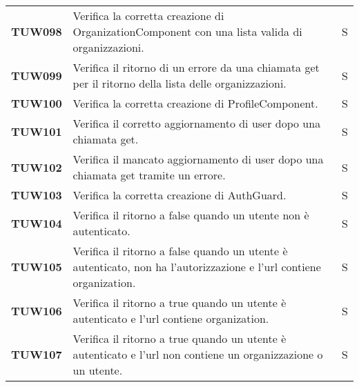 \documentclass[../../piano-di-qualifica.tex]{subfiles}
\begin{document}
\begin{longtable}[H]{>{\centering\bfseries}m{3cm} >{}m{10cm} >{\centering\arraybackslash}m{3cm}}
  TUW098             & Verifica la corretta creazione di OrganizationComponent con una lista valida di organizzazioni.                     & S                             \\

  TUW099             & Verifica il ritorno di un errore da una chiamata get per il ritorno della lista delle organizzazioni.               & S                             \\



  TUW100             & Verifica la corretta creazione di ProfileComponent.                                                                 & S                             \\

  TUW101             & Verifica il corretto aggiornamento di user dopo una chiamata get.                                                   & S                             \\

  TUW102             & Verifica il mancato aggiornamento di user dopo una chiamata get tramite un errore.                                  & S                             \\


  TUW103             & Verifica la corretta creazione di AuthGuard.                                                                        & S                             \\

  TUW104             & Verifica il ritorno a false quando un utente non è autenticato.                                                     & S                             \\

  TUW105             & Verifica il ritorno a false quando un utente è autenticato, non ha l'autorizzazione e l'url contiene organization.  & S                             \\

  TUW106             & Verifica il ritorno a true quando un utente è autenticato e l'url contiene organization.                            & S                             \\

  TUW107             & Verifica il ritorno a true quando un utente è autenticato e l'url non contiene un organizzazione o un utente.       & S                             \\


\end{longtable}
\end{document}
